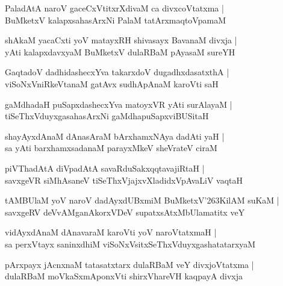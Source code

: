 \begin{shloka}
PaladAtA naroV gaceCxVtitxrXdivaM ca divxcoVtatxma |\\
BuMketxV kalapxsahasArxNi PalaM tatArxmaqtoVpamaM 
\end{shloka}

\begin{shloka}
shAkaM yacaCxti yoV matayxRH shivasayx BavanaM divxja |\\
yAti kalapxdavxyaM BuMketxV dulaRBaM pAyasaM sureYH 
\end{shloka}

\begin{shloka}
GaqtadoV dadhidashecxYva takarxdoV dugadhxdasatxthA |\\
viSoNxVniRkeVtanaM gatAvx sudhApAnaM karoVti saH
\end{shloka}

\begin{shloka}
gaMdhadaH puSapxdashecxYva matoyxVR yAti surAlayaM |\\
tiSeThxVduyxgasahasArxNi gaMdhapuSapxviBUSitaH 
\end{shloka}

\begin{shloka}
shayAyxdAnaM dAnasAraM bArxhamxNAya dadAti yaH |\\
sa yAti barxhamxsadanaM parayxMkeV sheVrateV ciraM 
\end{shloka}

\begin{shloka}
piVThadAtA diVpadAtA savaRduSakxqqtavajiRtaH |\\
savxgeVR siMhAsaneV tiSeThxVjajxvXladidxVpAvaLiV vaqtaH 
\end{shloka}

\begin{shloka}
tAMBUlaM yoV naroV dadAyxdUBxmiM BuMketxV\char'263KilAM suKaM |\\
savxgeRV deVvAMganAkorxVDeV supatxsAtxMbUlamatitx veY
\end{shloka}

\begin{shloka}
vidAyxdAnaM dAnavaraM karoVti yoV naroVtatxmaH |\\
sa perxVtayx saninxdhiM viSoNxVsitxSeThxVduyxgashatatarxyaM 
\end{shloka}

\begin{shloka}
pArxpayx jAcnxnaM tatasatxtarx dulaRBaM veY divxjoVtatxma |\\
dulaRBaM moVkaSxmAponxVti shirxVhareVH kaqpayA divxja
\end{shloka}

